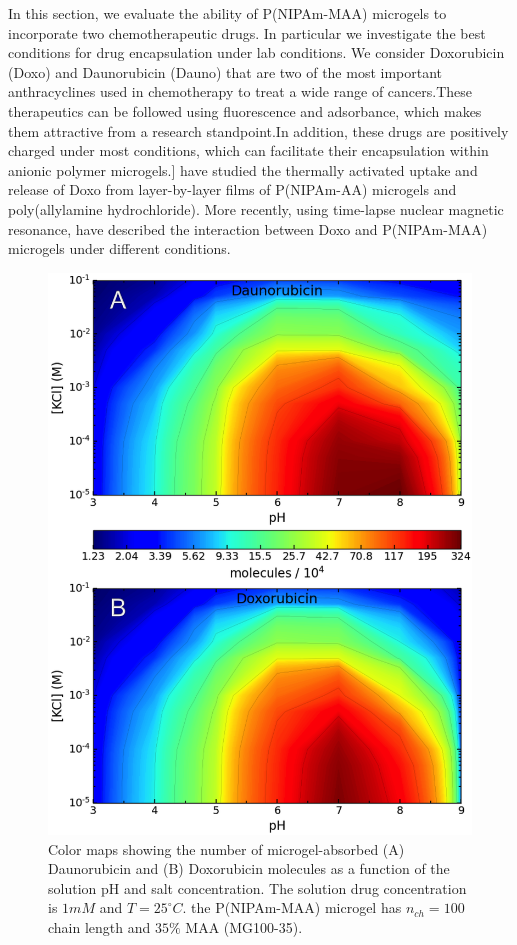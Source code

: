 In this section, we evaluate the ability of P(NIPAm-MAA) microgels to incorporate two chemotherapeutic drugs.
In particular we investigate the best conditions for drug encapsulation under lab conditions.
We consider Doxorubicin (Doxo) and Daunorubicin (Dauno) that are two of the most important anthracyclines used in chemotherapy to treat a wide range of cancers.
These therapeutics can be followed using fluorescence and adsorbance, which makes them attractive from a research standpoint. 
In addition, these drugs are positively charged under most conditions, which can facilitate their encapsulation within anionic polymer microgels.\addcite[Li2019]]
 have studied the thermally activated uptake and release of Doxo from layer-by-layer films of P(NIPAm-AA) microgels and poly(allylamine hydrochloride).
More recently, using time-lapse nuclear magnetic resonance,  have described the interaction between Doxo and P(NIPAm-MAA) microgels under different conditions.  



\begin{figure}[!tb]
	\centering
	\includegraphics[width=0.55\linewidth]{Figures/graph-gel/drug_ads.png}
	\caption{Color maps showing the number of microgel-absorbed (A) Daunorubicin and (B) Doxorubicin molecules as a function of the solution pH and salt concentration.
		The solution drug concentration is $1mM$ and $T=25 ^\circ C$.
		the P(NIPAm-MAA) microgel has $n_{ch}=100$ chain length and $35\%$ MAA (MG100-35).}
	\label{fig:drug_ads}
\end{figure}




